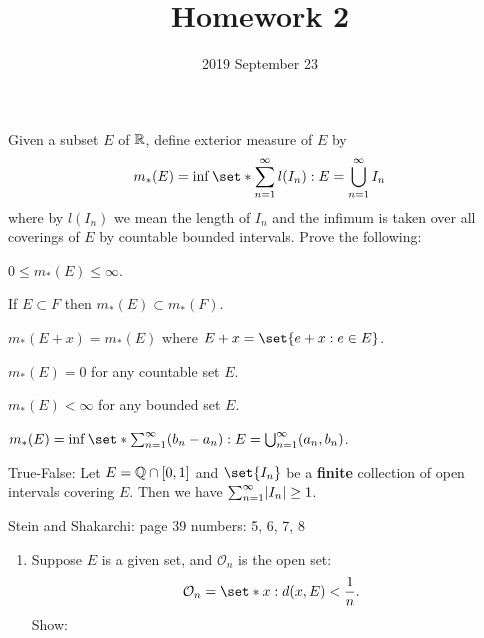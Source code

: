 \documentclass{../homework}
\title{Homework 2}
\author{}
\date{2019 September 23}
\begin{document}
\begin{problems}
\item Given a subset \(E\) of \(\mathbb R\), define exterior measure of
  \(E\) by
  \[
    m_*(E) = \inf\set*{
      \sum_{n=1}^\infty l(I_n)
      : E = \bigcup_{n=1}^\infty I_n
    }
  \]
  where by \(l(I_n)\) we mean the length of \(I_n\) and the infimum is
  taken over all coverings of \(E\) by countable bounded intervals.
  Prove the following:
  \begin{problems}
  \item \(0 \le m_*(E) \le \infty\).
  \item If \(E \subset F\) then \(m_*(E) \subset m_*(F)\).
  \item \(m_*(E+x) = m_*(E)\) where \(E+x = \set{e+x : e \in E}\).
  \item \(m_*(E) = 0\) for any countable set \(E\).
  \item \(m_*(E) < \infty\) for any bounded set \(E\).
  \item
    \(m_*(E) = \inf\set*{\sum_{n=1}^\infty (b_n-a_n) : E =
      \bigcup_{n=1}^\infty (a_n, b_n)}\).
  \end{problems}

  \begin{solution}
    \begin{problems}
    \item
    \item
    \item
    \item
    \item
    \item
    \end{problems}
  \end{solution}

\item True-False: Let \(E = \mathbb Q \cap [0, 1]\) and \(\set{I_n}\) be a
  \textbf{finite} collection of open intervals covering \(E\).  Then
  we have \(\sum_{n=1}^\infty \lvert I_n\rvert \ge 1\).

  \begin{solution}
  \end{solution}

\item Stein and Shakarchi: page 39 numbers: 5, 6, 7, 8

  \begin{book}
    \begin{enumerate}[start=5]
    \item Suppose \(E\) is a given set, and \(\mathcal O_n\) is the
      open set:
      \[
        \mathcal O_n = \set*{x : d(x, E) < \frac 1 n}.
      \]
      Show:
    \end{enumerate}
  \end{book}


\end{problems}
\end{document}
